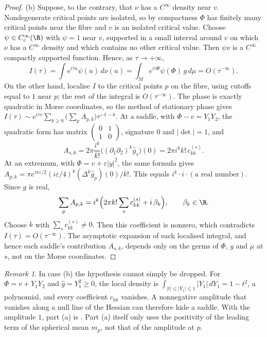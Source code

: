 \documentclass[11pt,a4paper]{article}
\theoremstyle{definition}
\theoremstyle{remark}
\newtheorem{remark}[theorem]{Remark}
\numberwithin{equation}{section}
\begin{document}
\begin{proof}
(b) Suppose, to the contrary, that $\nu$ has a $C^\infty$ density near $v$.
Nondegenerate critical points are isolated, so by compactness $\Phi$ has
finitely many critical points near the fibre and $v$ is an isolated critical
value. Choose $\psi\in C^\infty_c(\R)$ with $\psi=1$ near $v$, supported in a
small interval around $v$ on which $\nu$ has a $C^\infty$ density and which
contains no other critical value. Then $\psi\nu$ is a
$C^\infty$ compactly supported function. Hence, as $\tau\to+\infty$,
\[
 I(\tau)=\int e^{i\tau u}\psi(u)\,d\nu(u)
 =\int_Me^{i\tau\Phi}\psi(\Phi)\,g\,d\mu=O(\tau^{-\infty}).
\]
On the other hand, localise $I$ to the critical points $p$ on the fibre,
using cutoffs equal to $1$ near $p$; the rest of the integral is
$O(\tau^{-\infty})$. The phase is exactly quadratic in Morse coordinates, so
the method of stationary phase \cite[Lemma~7.7.3, Theorem~7.7.5]{R060}
gives $I(\tau)\sim e^{i\tau v}\sum_{k\ge0}\bigl(\sum_pA_{p,k}\bigr)\tau^{-1-k}$.
At a saddle, with $\Phi-v=Y_1Y_2$, the quadratic form has matrix
$\left(\begin{smallmatrix}0&1\\1&0\end{smallmatrix}\right)$, signature $0$
and $|\det|=1$, and
\[
 A_{s,k}=2\pi\frac{i^k}{k!}\bigl((\partial_1\partial_2)^k\widehat g_s\bigr)(0)
 =2\pi i^kk!\,c^{(s)}_{kk}.
\]
At an extremum, with $\Phi=v+\varepsilon|y|^2$, the same formula gives
$A_{p,k}=\pi e^{i\pi\varepsilon/2}(i\varepsilon/4)^k(\Delta^k\widehat g_p)(0)/k!$.
This equals $i^k\cdot i\cdot(\text{a real number})$. Since $g$ is real,
\[
 \sum_pA_{p,k}=i^k\Bigl(2\pi k!\sum_sc^{(s)}_{kk}+i\,\beta_k\Bigr),
 \qquad \beta_k\in\R .
\]
Choose $k$ with $\sum_sc^{(s)}_{kk}\ne0$. Then this coefficient is nonzero,
which contradicts $I(\tau)=O(\tau^{-\infty})$. The asymptotic expansion of each localised integral, and hence each
saddle's contribution $A_{s,k}$, depends only on the germs of $\Phi$, $g$ and
$\mu$ at $s$, not on the Morse coordinates.
\end{proof}

\begin{remark}\label{B:F:rem:vis}
In case (b) the hypothesis cannot simply be dropped. For $\Phi=v+Y_1Y_2$
and $\widehat g=Y_1^2\ge0$, the local density is
$\int_{|t|\le|Y_1|\le1}|Y_1|\,dY_1=1-t^2$, a polynomial, and every
coefficient $c_{kk}$ vanishes. A nonnegative amplitude that vanishes along a
null line of the Hessian can therefore hide a saddle. With the amplitude
$1$, part (a) is \cite[Lemma~2.2]{R021}. Part (a) itself only uses the
positivity of the leading term of the spherical mean $m_p$, not that of the
amplitude at $p$.
\end{remark}
\end{document}
